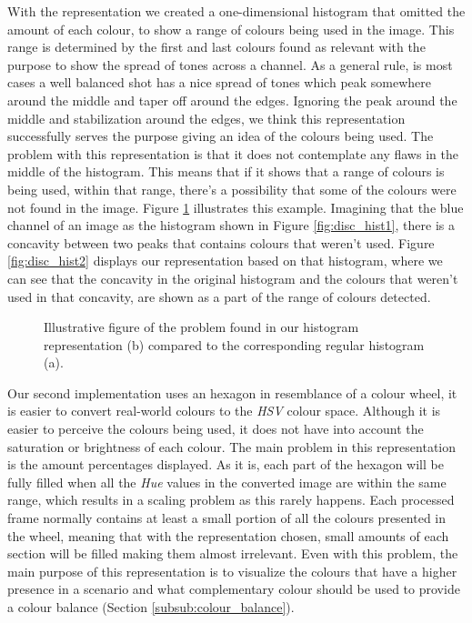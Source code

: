 With the representation we created a one-dimensional histogram that omitted the amount of each colour, to show a range of colours being used in the image. This range is determined by the first and last colours found as relevant with the purpose to show the spread of tones across a channel. As a general rule, is most cases a well balanced shot has a nice spread of tones which peak somewhere around the middle and taper off around the edges. Ignoring the peak around the middle and stabilization around the edges, we think this representation successfully serves the purpose giving an idea of the colours being used. The problem with this representation is that it does not contemplate any flaws in the middle of the histogram. This means that if it shows that a range of colours is being used, within that range, there's a possibility that some of the colours were not found in the image. Figure \ref{fig:disc_hist} illustrates this example. Imagining that the blue channel of an image as the histogram shown in Figure \ref{fig:disc_hist1}, there is a concavity between two peaks that contains colours that weren't used. Figure \ref{fig:disc_hist2} displays our representation based on that histogram, where we can see that the concavity in the original histogram and the colours that weren't used in that concavity, are shown as a part of the range of colours detected.

\begin{figure}[htb]
	\centering
  	\caption{Illustrative figure of the problem found in our histogram representation (b) compared to the corresponding regular histogram (a).}
	\label{fig:disc_hist}
\end{figure}

Our second implementation uses an hexagon in resemblance of a colour wheel, it is easier to convert real-world colours to the \emph{HSV} colour space. Although it is easier to perceive the colours being used, it does not have into account the saturation or brightness of each colour. 
The main problem in this representation is the amount percentages displayed. As it is, each part of the hexagon will be fully filled when all the \emph{Hue} values in the converted image are within the same range, which results in a scaling problem as this rarely happens. Each processed frame normally contains at least a small portion of all the colours presented in the wheel, meaning that with the representation chosen, small amounts of each section will be filled making them almost irrelevant. Even with this problem, the main purpose of this representation is to visualize the colours that have a higher presence in a scenario and what complementary colour should be used to provide a colour balance (Section \ref{subsub:colour_balance}).


